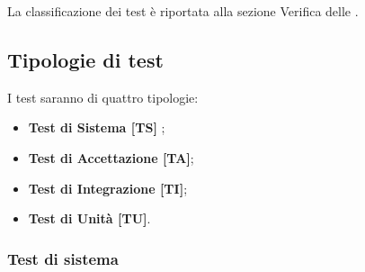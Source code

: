 
La classificazione dei test è riportata alla sezione Verifica delle . \\

\subsection{Tipologie di test}
I test saranno di quattro tipologie:
\begin{itemize}
	\item \textbf{Test di Sistema [TS] };
	\item \textbf{Test di Accettazione [TA]};
	\item \textbf{Test di Integrazione [TI]};
	\item \textbf{Test di Unità [TU]}.\\
\end{itemize}

\subsubsection{Test di sistema}

